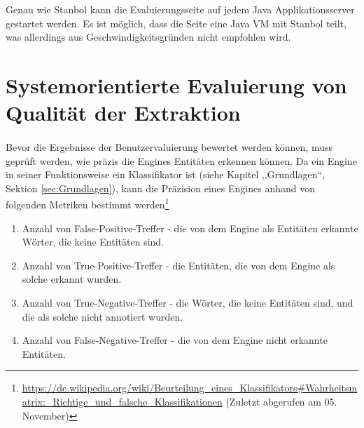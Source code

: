 
Genau wie Stanbol kann die Evaluierungsseite auf jedem Java Applikationsserver gestartet werden. Es ist möglich, dass die Seite eine Java VM mit Stanbol teilt, was allerdings aus Geschwindigkeitsgründen nicht empfohlen wird.

\section{Systemorientierte Evaluierung von Qualität der Extraktion} \label{sec:sysevalsec}
\paragraph{}
Bevor die Ergebnisse der Benutzervaluierung bewertet werden können, muss geprüft werden, wie präzis die Engines Entitäten erkennen können. Da ein Engine in seiner Funktionsweise ein Klassifikator ist (siehe Kapitel ,,Grundlagen``, Sektion \ref{sec:Grundlagen}), kann die Präzision eines Engines anhand von folgenden Metriken bestimmt werden\footnote{\url{https://de.wikipedia.org/wiki/Beurteilung_eines_Klassifikators\#Wahrheitsmatrix:_Richtige_und_falsche_Klassifikationen} (Zuletzt abgerufen am 05. November)}
\begin{enumerate}
\item Anzahl von False-Positive-Treffer - die von dem Engine als Entitäten erkannte Wörter, die keine Entitäten sind.
\item Anzahl von True-Positive-Treffer - die Entitäten, die von dem Engine als solche erkannt wurden.
\item Anzahl von True-Negative-Treffer - die Wörter, die keine Entitäten sind, und die als solche nicht annotiert wurden.
\item Anzahl von False-Negative-Treffer - die von dem Engine nicht erkannte Entitäten.
\end{enumerate}


